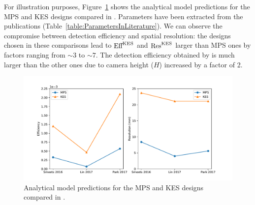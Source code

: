 \documentclass[a4paper,english,12pt]{article}
\begin{document}
For illustration purposes, Figure~\ref{fig:AMpredictions} shows the analytical model predictions for the MPS and KES designs compared in \citep{Smeets2016, Lin2017, Park2017}. Parameters have been extracted from the publications (Table~\ref{table:ParametersInLiterature}). We can observe the compromise between detection efficiency and spatial resolution: the designs chosen in these comparisons lead to $\textrm{Eff}_{}^{\textrm{KES}}$ and $\textrm{Res}_{}^{\textrm{KES}}$ larger than MPS ones by factors ranging from $\sim3$ to $\sim7$. The detection efficiency obtained by \cite{Park2017} is much larger than the other ones due to camera height ($H$) increased by a factor of 2. 

\begin{figure}[!htp]
  \centering
	\includegraphics[width=1\linewidth]{./figures/Literature}
  \caption{\label{fig:AMpredictions} Analytical model predictions for the MPS and KES designs compared in \citep{Smeets2016, Lin2017, Park2017}.}
\end{figure} 
\end{document}
